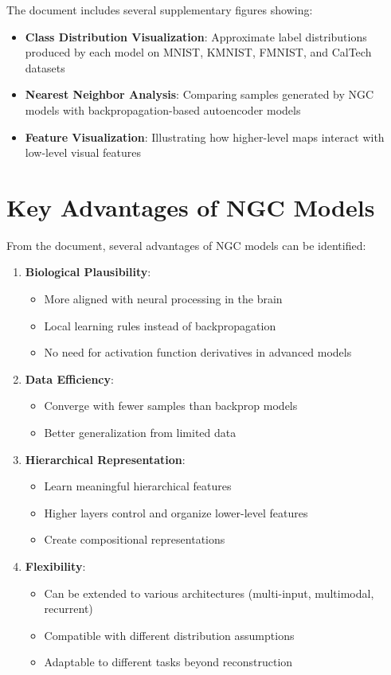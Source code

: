 \documentclass{article}
\begin{document}
The document includes several supplementary figures showing:

\begin{itemize}
  \item \textbf{Class Distribution Visualization}: Approximate label distributions produced by each model on MNIST, KMNIST, FMNIST, and CalTech datasets
  \item \textbf{Nearest Neighbor Analysis}: Comparing samples generated by NGC models with backpropagation-based autoencoder models
  \item \textbf{Feature Visualization}: Illustrating how higher-level maps interact with low-level visual features
\end{itemize}

\section{Key Advantages of NGC Models}

From the document, several advantages of NGC models can be identified:

\begin{enumerate}
  \item \textbf{Biological Plausibility}:
  \begin{itemize}
    \item More aligned with neural processing in the brain
    \item Local learning rules instead of backpropagation
    \item No need for activation function derivatives in advanced models
  \end{itemize}

  \item \textbf{Data Efficiency}:
  \begin{itemize}
    \item Converge with fewer samples than backprop models
    \item Better generalization from limited data
  \end{itemize}

  \item \textbf{Hierarchical Representation}:
  \begin{itemize}
    \item Learn meaningful hierarchical features
    \item Higher layers control and organize lower-level features
    \item Create compositional representations
  \end{itemize}

  \item \textbf{Flexibility}:
  \begin{itemize}
    \item Can be extended to various architectures (multi-input, multimodal, recurrent)
    \item Compatible with different distribution assumptions
    \item Adaptable to different tasks beyond reconstruction
  \end{itemize}
\end{enumerate}
\end{document}
